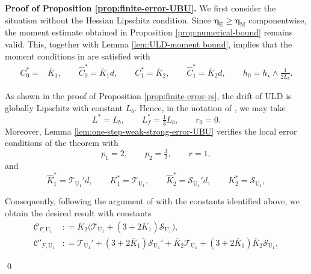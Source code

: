 \documentclass[12pt]{article}
\newenvironment{redtext}
  {\color{black}\ignorespaces}
  {\ignorespacesafterend}
\numberwithin{equation}{section}
\renewenvironment{proof}%
  {\begin{trivlist}%
   \item[]\ignorespaces}%
  {\qed\end{trivlist}}
\begin{document}
\begin{redtext}

\begin{proof}
\textbf{Proof of Proposition \ref{prop:finite-error-UBU}.}
We first consider the situation without the Hessian Lipschitz condition.
Since $\boldsymbol{\eta}_\mathrm{E}\geq \boldsymbol{\eta}_\mathrm{M}$ componentwise, the moment estimate obtained in Proposition \ref{prop:numerical-bound} remains valid. This, together with Lemma \ref{lem:ULD-moment bound}, implies that the moment conditions in \cite[Theorem 3.3]{yang2025non} are satisfied with
\begin{align}
C_0^*=&\bar K_1,
\qquad
\hat C_0^*=\bar K_1d,
\qquad
C_1^*=\bar K_2,
\qquad
\hat C_1^*=\bar K_2d,
\qquad
h_0
=
h_\star
\wedge
\tfrac{1}{2L_b}.
\end{align}


As shown in the proof of Proposition
\ref{prop:finite-error-rs}, the drift of ULD
is globally Lipschitz with constant \(L_b\). Hence, in the
notation of \cite[Theorem 3.3]{yang2025non}, we may take
\[
L^*=L_b,
\qquad
L_f^*=\tfrac13L_b,
\qquad
r_0=0.
\]
Moreover, Lemma
\ref{lem:one-step-weak-strong-error-UBU} verifies the local
error conditions of the theorem with
\[
p_1=2,
\qquad
p_2=\tfrac32,
\qquad
r=1,
\]
and
\[
\hat K_1^*=\mathcal T_{\mathrm{U}_1}'d,
\qquad
K_1^*=\mathcal T_{\mathrm{U}_1},
\qquad
\hat K_2^*=\mathcal S_{\mathrm{U}_1}'d,
\qquad
K_2^*=\mathcal S_{\mathrm{U}_1},
\]

Consequently, following the argument of \cite[Theorem 3.3]{yang2025non} with the constants identified above, we obtain the desired result with constants
\begin{equation}\label{eq:constants-c-f-U1}
\begin{aligned}
\mathcal C_{F,{\mathrm{U}_1}}&:
=
\bar K_2\big(\mathcal{T}_{\mathrm{U}_1}
+
(3+2\bar K_1)\mathcal{S}_{\mathrm{U}_1}\big),
\\
\mathcal C'_{F,{\mathrm{U}_1}}&:
=
\mathcal{T}_{\mathrm{U}_1}'
+
(3+2\bar K_1)\mathcal{S}_{\mathrm{U}_1}'
+
\bar K_2\mathcal{T}_{\mathrm{U}_1}
+
(3+2\bar K_1)\bar K_2\mathcal{S}_{\mathrm{U}_1},
\end{aligned}
\end{equation}


\end{proof}
\end{redtext}
\end{document}
